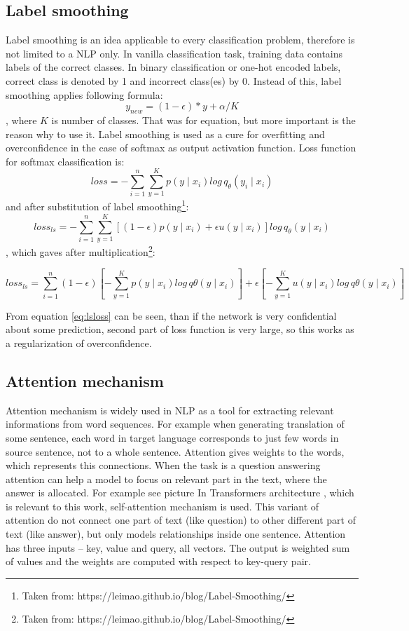 \subsection{Label smoothing}
Label smoothing is an idea applicable to every classification problem, therefore is not limited to a NLP only. %
In vanilla classification task, training data contains labels of the correct classes. In binary classification or one-hot encoded labels, correct class is denoted by 1 and incorrect class(es) by 0. Instead of this, label smoothing applies following formula: 
$$y_{new} = (1 - \epsilon) * y + \alpha / K$$, where $K$ is number of classes. That was for equation, but more important is the reason why to use it. Label smoothing is used as a cure for overfitting and overconfidence in the case of softmax 
 as output activation function. Loss function for softmax classification is: 
 $$ loss = -\sum_{i=1}^{n} \sum_{y=1}^{K} p(y \mid x_i) log \, q_{\theta} ( y_i \mid x_i ) $$
 and after substitution of label smoothing\footnote{Taken from: https://leimao.github.io/blog/Label-Smoothing/}:
$$
loss_{ls} = -\sum_{i=1}^{n} \sum_{y=1}^{K} [(1-\epsilon) p(y \mid x_i)+\epsilon u(y\mid x_i)]log \, q_\theta(y \mid x_i) $$,
which gaves after multiplication\footnote{Taken from: https://leimao.github.io/blog/Label-Smoothing/}:

 \begin{equation} \label{eq:lsloss}
 loss_{ls}= \sum_{i=1}^{n} {(1- \epsilon)[- \sum_{y=1}^{K} p(y\mid x_i) log \, q\theta(y \mid x_i)]+\epsilon [- \sum_{y=1}^{K} u(y \mid x_i)log \, q\theta (y\mid x_i)]}
 \end{equation}
 
From equation \ref{eq:lsloss} can be seen, than if the network is very confidential about some prediction, second part of loss function is very large, so this works as a regularization of overconfidence.


\subsection{Attention mechanism}
\label{sub:attention}
Attention mechanism is widely used in NLP as a tool for extracting relevant informations from word sequences. For example when generating translation of some sentence, each word in target language corresponds to just few words in source sentence, not to a whole sentence. Attention gives weights to the words, which represents this connections. When the task is a question answering %
attention can help a model to focus on relevant part in the text, where the answer is allocated. For example see picture %
In Transformers architecture %
, which is relevant to this work, self-attention mechanism is used. This variant of attention do not connect one part of text (like question) to other different part of text (like answer), but only models relationships inside one sentence. %
Attention has three inputs -- key, value and query, all vectors. The output is weighted sum of values and the weights are computed with respect to key-query pair. 


